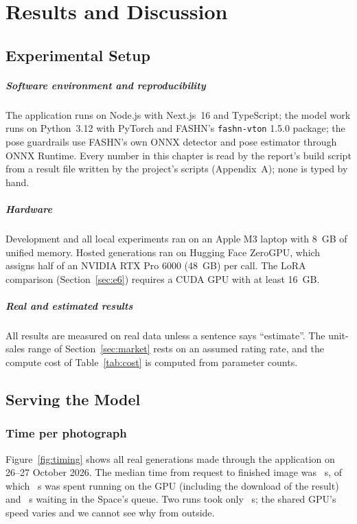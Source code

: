 \chapter{Results and Discussion}

\section{Experimental Setup}

\paragraph{Software environment and reproducibility} The application runs on Node.js with Next.js~16 and TypeScript; the model work runs on Python~3.12 with PyTorch and FASHN's \texttt{fashn-vton} 1.5.0 package; the pose guardrails use FASHN's own ONNX detector and pose estimator through ONNX Runtime. Every number in this chapter is read by the report's build script from a result file written by the project's scripts (Appendix~A); none is typed by hand.

\paragraph{Hardware} Development and all local experiments ran on an Apple M3 laptop with 8~GB of unified memory. Hosted generations ran on Hugging Face ZeroGPU, which assigns half of an NVIDIA RTX Pro 6000 (48~GB) per call. The LoRA comparison (Section~\ref{sec:e6}) requires a CUDA GPU with at least 16~GB.

\paragraph{Real and estimated results} All results are measured on real data unless a sentence says ``estimate''. The unit-sales range of Section~\ref{sec:market} rests on an assumed rating rate, and the compute cost of Table~\ref{tab:cost} is computed from parameter counts.

\section{Serving the Model}

\subsection{Time per photograph}

Figure~\ref{fig:timing} shows all \vNRuns{} real generations made through the application on 26--27 October 2026. The median time from request to finished image was \vMedTotal{}~s, of which \vMedGpu{}~s was spent running on the GPU (including the download of the result) and \vMedQueue{}~s waiting in the Space's queue. Two runs took only \vMinTotal{}~s; the shared GPU's speed varies and we cannot see why from outside.

